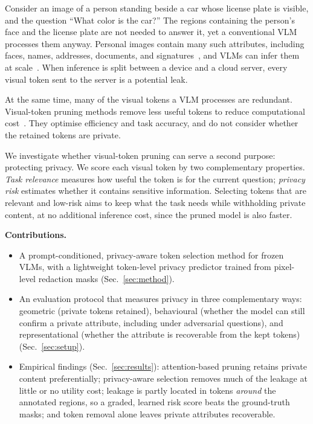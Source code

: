 \documentclass{article}
\begin{document}
Consider an image of a person standing beside a car whose license plate is visible, and the question ``What color is the
car?'' The regions containing the person's face and the license plate are not needed to answer it, yet a conventional VLM
processes them anyway. Personal images contain many such attributes, including faces, names, addresses, documents, and
signatures~\cite{orekondy2017towards}, and VLMs can infer them at scale~\cite{tomekce2024private}. When inference is split
between a device and a cloud server, every visual token sent to the server is a potential leak.

At the same time, many of the visual tokens a VLM processes are redundant. Visual-token pruning methods remove less useful tokens
to reduce computational cost~\cite{chen2024imageworth12tokens,pmlr-v267-zhang25s,Zhang_2025_ICCV,alvar2025divprune}.
They optimise efficiency and task accuracy, and do not consider whether the retained tokens are private.

We investigate whether visual-token pruning can serve a second purpose: protecting privacy. We score each visual token by two
complementary properties. \emph{Task relevance} measures how useful the token is for the current question; \emph{privacy risk}
estimates whether it contains sensitive information. Selecting tokens that are relevant and low-risk aims to keep what the
task needs while withholding private content, at no additional inference cost, since the pruned model is also faster.

\textbf{Contributions.}
\begin{itemize}
\item A prompt-conditioned, privacy-aware token selection method for frozen VLMs, with a lightweight token-level privacy predictor
trained from pixel-level redaction masks (Sec.~\ref{sec:method}).
\item An evaluation protocol that measures privacy in three complementary ways: geometric (private tokens retained), behavioural
(whether the model can still confirm a private attribute, including under adversarial questions), and representational (whether the
attribute is recoverable from the kept tokens) (Sec.~\ref{sec:setup}).
\item Empirical findings (Sec.~\ref{sec:results}): attention-based pruning retains private content preferentially; privacy-aware selection
removes much of the leakage at little or no utility cost; leakage is partly located in tokens \emph{around} the annotated regions, so a
graded, learned risk score beats the ground-truth masks; and token removal alone leaves private attributes recoverable.
\end{itemize}
\end{document}
